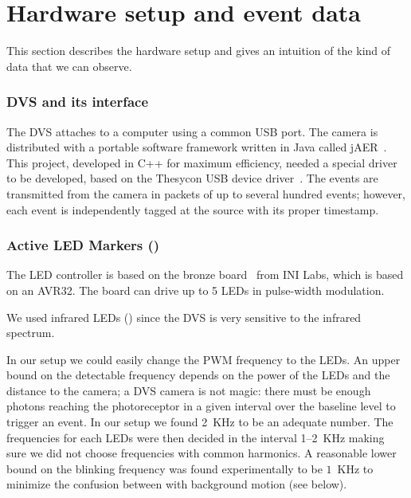 
\section{Hardware setup and event data\label{sec:Hardware-setup-and}}

This section describes the hardware setup and gives an intuition of
the kind of data that we can observe.


\subsubsection{DVS and its interface \label{sec:interface}}

The DVS attaches to a computer using a common USB port. The camera
is distributed with a portable software framework written in Java
called jAER~\cite{jaer}. This project, developed in C++ for maximum
efficiency, needed a special driver to be developed, based on the
Thesycon USB device driver~\cite{thesycon}. The events are transmitted
from the camera in packets of up to several hundred events; however,
each event is independently tagged at the source with its proper timestamp. 




\subsubsection{Active LED Markers (\ALMs)\label{sec:leds}}

The LED controller is based on the bronze board~\cite{bronzeboard}
from INI Labs, which is based on an AVR32. The board can drive up
to 5 LEDs in pulse-width modulation.  

We used infrared LEDs () since the DVS is very sensitive to
the infrared spectrum. 



In our setup we could easily change the PWM frequency to the LEDs.
An upper bound on the detectable frequency depends on the power of
the LEDs and the distance to the camera; a DVS camera is not magic:
there must be enough photons reaching the photoreceptor in a given
interval over the baseline level to trigger an event. In our setup
we found 2~KHz to be an adequate number. The frequencies for each
LEDs were then decided in the interval 1--2~KHz making sure we did
not choose frequencies with common harmonics. A reasonable lower bound
on the blinking frequency was found experimentally to be $1$~KHz
to minimize the confusion between with background motion (see 
below).


